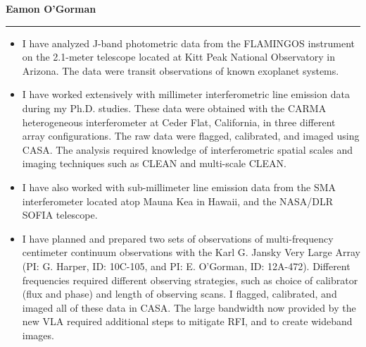 \documentclass[11pt]{letter} %
\begin{document}

\longindentation=0pt                       %
\let\raggedleft\raggedright                %
 

\begin{flushleft}
{\large\bf Eamon O'Gorman}
\end{flushleft}
\medskip\hrule height 1pt
\begin{flushright}


\end{flushright} 

 \begin{itemize}

    \item I have analyzed J-band photometric data from the FLAMINGOS instrument on the 2.1-meter telescope located at Kitt Peak National Observatory in Arizona. The data were transit observations of known exoplanet systems.\\ 
  
    \item I have worked extensively with millimeter interferometric line emission data during my Ph.D. studies. These data were obtained with the CARMA heterogeneous interferometer at Ceder Flat, California, in three different array configurations. The raw data were flagged, calibrated, and imaged using CASA. The analysis required knowledge of interferometric spatial scales and imaging techniques such as CLEAN and multi-scale CLEAN. \\
    
    \item I have also worked with sub-millimeter line emission data from the SMA interferometer located atop Mauna Kea in Hawaii, and the NASA/DLR SOFIA telescope. \\ 
    
    \item I have planned and prepared two sets of observations of multi-frequency centimeter continuum observations with the Karl G. Jansky Very Large Array (PI: G. Harper, ID: 10C-105, and PI: E. O'Gorman, ID: 12A-472). Different frequencies required different observing strategies, such as choice of calibrator (flux and phase) and length of observing scans. I flagged, calibrated, and imaged all of these data in CASA. The large bandwidth now provided by the new VLA required additional steps to mitigate RFI, and to create wideband images.\\ 
        

\end{itemize}
\end{document}
